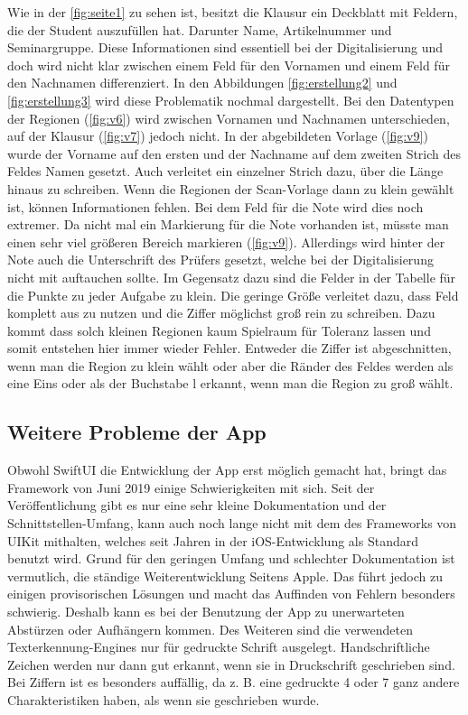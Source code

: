\documentclass[notables, nomenclature, oneside, 150]{HSMW-Thesis}
\begin{document}
			Wie in der \autoref{fig:seite1} zu sehen ist, besitzt die Klausur ein Deckblatt mit Feldern, die der Student auszufüllen hat. Darunter Name, Artikelnummer und Seminargruppe. Diese Informationen sind essentiell bei der Digitalisierung und doch wird nicht klar zwischen einem Feld für den Vornamen und einem Feld für den Nachnamen differenziert. In den Abbildungen \ref{fig:erstellung2} und \ref{fig:erstellung3} wird diese Problematik nochmal dargestellt. Bei den Datentypen der Regionen (\ref{fig:v6}) wird zwischen Vornamen und Nachnamen unterschieden, auf der Klausur (\ref{fig:v7}) jedoch nicht. In der abgebildeten Vorlage (\ref{fig:v9}) wurde der Vorname auf den ersten und der Nachname auf dem zweiten Strich des Feldes Namen gesetzt. Auch verleitet ein einzelner Strich dazu, über die Länge hinaus zu schreiben. Wenn die Regionen der Scan-Vorlage dann zu klein gewählt ist, können Informationen fehlen. Bei dem Feld für die Note wird dies noch extremer. Da nicht mal ein Markierung für die Note vorhanden ist, müsste man einen sehr viel größeren Bereich markieren (\ref{fig:v9}). Allerdings wird hinter der Note auch die Unterschrift des Prüfers gesetzt, welche bei der Digitalisierung nicht mit auftauchen sollte. Im Gegensatz dazu sind die Felder in der Tabelle für die Punkte zu jeder Aufgabe zu klein. Die geringe Größe verleitet dazu, dass Feld komplett aus zu nutzen und die Ziffer möglichst groß rein zu schreiben. Dazu kommt dass solch kleinen Regionen kaum Spielraum für Toleranz lassen und somit entstehen hier immer wieder Fehler. Entweder die Ziffer ist abgeschnitten, wenn man die Region zu klein wählt oder aber die Ränder des Feldes werden als eine Eins oder als der Buchstabe l erkannt, wenn man die Region zu groß wählt.

		\subsection{Weitere Probleme der App}
			Obwohl SwiftUI die Entwicklung der App erst möglich gemacht hat, bringt das Framework von Juni 2019 einige Schwierigkeiten mit sich. Seit der Veröffentlichung gibt es nur eine sehr kleine Dokumentation und der Schnittstellen-Umfang, kann auch noch lange nicht mit dem des Frameworks von UIKit mithalten, welches seit Jahren in der iOS-Entwicklung als Standard benutzt wird. Grund für den geringen Umfang und schlechter Dokumentation ist vermutlich, die ständige Weiterentwicklung Seitens Apple. Das führt jedoch zu einigen provisorischen Lösungen und macht das Auffinden von Fehlern besonders schwierig. Deshalb kann es bei der Benutzung der App zu unerwarteten Abstürzen oder Aufhängern kommen. Des Weiteren sind die verwendeten Texterkennung-Engines nur für gedruckte Schrift ausgelegt. Handschriftliche Zeichen werden nur dann gut erkannt, wenn sie in Druckschrift geschrieben sind. Bei Ziffern ist es besonders auffällig, da z. B. eine gedruckte 4 oder 7 ganz andere Charakteristiken haben, als wenn sie geschrieben wurde.
	
\end{document}
